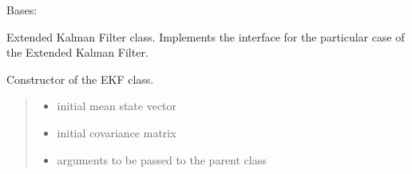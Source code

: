 \documentclass[letterpaper,10pt,english]{sphinxmanual}
\begin{document}
\begin{fulllineitems}
\label{\detokenize{EKF:EKF.EKF}}
\pysigstartsignatures
{}
\pysigstopsignatures
\sphinxAtStartPar
Bases: 

\sphinxAtStartPar
Extended Kalman Filter class. Implements the  interface for the particular case of the Extended Kalman Filter.

\begin{fulllineitems}
\label{\detokenize{EKF:EKF.EKF.__init__}}
\pysigstartsignatures
{}
\pysigstopsignatures
\sphinxAtStartPar
Constructor of the EKF class.
\begin{quote}\begin{description}
\begin{itemize}
\item {} 
\sphinxAtStartPar
{} \textendash{} initial mean state vector

\item {} 
\sphinxAtStartPar
{} \textendash{} initial covariance matrix

\item {} 
\sphinxAtStartPar
{} \textendash{} arguments to be passed to the parent class

\end{itemize}

\end{description}\end{quote}

\end{fulllineitems}



\end{fulllineitems}
\end{document}
